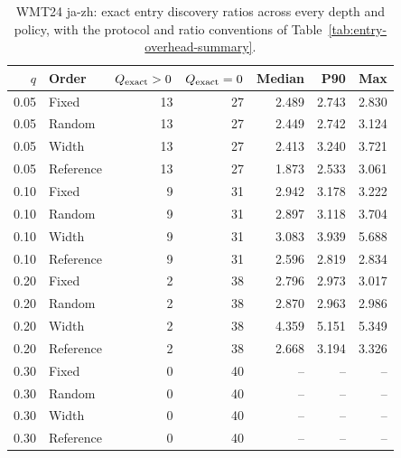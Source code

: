 \begin{table}[t]
\centering\small


\begin{tabular}{rlrrrrr}
\toprule
$q$ & Order & $Q_{\rm exact}>0$ & $Q_{\rm exact}=0$ & Median & P90 & Max \\
\midrule
0.05 & Fixed & 13 & 27 & 2.489 & 2.743 & 2.830 \\
0.05 & Random & 13 & 27 & 2.449 & 2.742 & 3.124 \\
0.05 & Width & 13 & 27 & 2.413 & 3.240 & 3.721 \\
0.05 & Reference & 13 & 27 & 1.873 & 2.533 & 3.061 \\
0.10 & Fixed & 9 & 31 & 2.942 & 3.178 & 3.222 \\
0.10 & Random & 9 & 31 & 2.897 & 3.118 & 3.704 \\
0.10 & Width & 9 & 31 & 3.083 & 3.939 & 5.688 \\
0.10 & Reference & 9 & 31 & 2.596 & 2.819 & 2.834 \\
0.20 & Fixed & 2 & 38 & 2.796 & 2.973 & 3.017 \\
0.20 & Random & 2 & 38 & 2.870 & 2.963 & 2.986 \\
0.20 & Width & 2 & 38 & 4.359 & 5.151 & 5.349 \\
0.20 & Reference & 2 & 38 & 2.668 & 3.194 & 3.326 \\
0.30 & Fixed & 0 & 40 & -- & -- & -- \\
0.30 & Random & 0 & 40 & -- & -- & -- \\
0.30 & Width & 0 & 40 & -- & -- & -- \\
0.30 & Reference & 0 & 40 & -- & -- & -- \\
\bottomrule
\end{tabular}
\caption{WMT24 ja-zh: exact entry discovery ratios across every depth and policy, with the protocol and ratio conventions of Table~\ref{tab:entry-overhead-summary}.}
\label{tab:entry-overhead-all-5}
\end{table}
